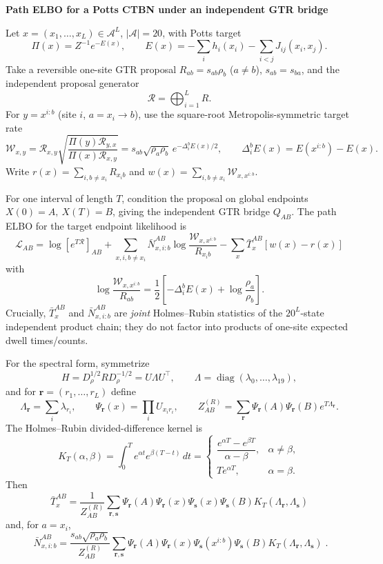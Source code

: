 \documentclass[10pt]{article}
\newcommand{\A}{\mathcal A}
\newcommand{\Rcal}{\mathcal R}
\newcommand{\Wcal}{\mathcal W}
\begin{document}
\small
\begin{center}
{\large\bf Path ELBO for a Potts CTBN under an independent GTR bridge}
\end{center}

Let \(x=(x_1,\ldots,x_L)\in\A^L\), \(|\A|=20\), with Potts target
\[
 \Pi(x)=Z^{-1}e^{-E(x)},\qquad
 E(x)=-\sum_i h_i(x_i)-\sum_{i<j}J_{ij}(x_i,x_j).
\]
Take a reversible one-site GTR proposal
\(R_{ab}=s_{ab}\rho_b\) (\(a\ne b\)), \(s_{ab}=s_{ba}\), and the independent
proposal generator
\[
 \Rcal=\bigoplus_{i=1}^L R .
\]
For \(y=x^{i:b}\) (site \(i\), \(a=x_i\to b\)), use the square-root
Metropolis-symmetric target rate
\[
 \Wcal_{x,y}
 =\Rcal_{x,y}\sqrt{\frac{\Pi(y)\Rcal_{y,x}}{\Pi(x)\Rcal_{x,y}}}
 =s_{ab}\sqrt{\rho_a\rho_b}\,
   e^{-\Delta_i^bE(x)/2},
 \qquad \Delta_i^bE(x)=E(x^{i:b})-E(x).
\]
Write \(r(x)=\sum_{i,b\ne x_i}R_{x_i b}\) and
\(w(x)=\sum_{i,b\ne x_i}\Wcal_{x,x^{i:b}}\).

For one interval of length \(T\), condition the proposal on global endpoints
\(X(0)=A,\ X(T)=B\), giving the independent GTR bridge \(Q_{AB}\).
The path ELBO for the target endpoint likelihood is
\[
\boxed{\;
 \mathcal L_{AB}
 =\log [e^{T\Rcal}]_{AB}
 +\sum_{x,i,b\ne x_i}\bar N^{AB}_{x,i:b}
       \log\frac{\Wcal_{x,x^{i:b}}}{R_{x_i b}}
 -\sum_x\bar T_x^{AB}[w(x)-r(x)] \; }
\]
with
\[
 \log\frac{\Wcal_{x,x^{i:b}}}{R_{ab}}
 =\frac12\left[-\Delta_i^bE(x)+\log\frac{\rho_a}{\rho_b}\right].
\]
Crucially, \(\bar T_x^{AB}\) and \(\bar N^{AB}_{x,i:b}\) are \emph{joint}
Holmes--Rubin statistics of the \(20^L\)-state independent product chain;
they do not factor into products of one-site expected dwell times/counts.

For the spectral form, symmetrize
\[
 H=D_\rho^{1/2}RD_\rho^{-1/2}=U\Lambda U^\top,\qquad
 \Lambda=\operatorname{diag}(\lambda_0,\ldots,\lambda_{19}),
\]
and for \(\boldsymbol r=(r_1,\ldots,r_L)\) define
\[
 \Lambda_{\boldsymbol r}=\sum_i\lambda_{r_i},\qquad
 \Psi_{\boldsymbol r}(x)=\prod_i U_{x_i r_i},\qquad
 Z_{AB}^{(R)}
 =\sum_{\boldsymbol r}\Psi_{\boldsymbol r}(A)\Psi_{\boldsymbol r}(B)
 e^{T\Lambda_{\boldsymbol r}}.
\]
The Holmes--Rubin divided-difference kernel is
\[
 K_T(\alpha,\beta)
 =\int_0^T e^{\alpha t}e^{\beta(T-t)}\,dt
 =
 \begin{cases}
 \dfrac{e^{\alpha T}-e^{\beta T}}{\alpha-\beta},&\alpha\ne\beta,\\[5pt]
 Te^{\alpha T},&\alpha=\beta.
 \end{cases}
\]
Then
\[
 \boxed{\;
 \bar T_x^{AB}
 =\frac{1}{Z_{AB}^{(R)}}
 \sum_{\boldsymbol r,\boldsymbol s}
 \Psi_{\boldsymbol r}(A)\Psi_{\boldsymbol r}(x)
 \Psi_{\boldsymbol s}(x)\Psi_{\boldsymbol s}(B)
 K_T(\Lambda_{\boldsymbol r},\Lambda_{\boldsymbol s}) \;}
\]
and, for \(a=x_i\),
\[
 \boxed{\;
 \bar N_{x,i:b}^{AB}
 =\frac{s_{ab}\sqrt{\rho_a\rho_b}}{Z_{AB}^{(R)}}
 \sum_{\boldsymbol r,\boldsymbol s}
 \Psi_{\boldsymbol r}(A)\Psi_{\boldsymbol r}(x)
 \Psi_{\boldsymbol s}(x^{i:b})\Psi_{\boldsymbol s}(B)
 K_T(\Lambda_{\boldsymbol r},\Lambda_{\boldsymbol s}) \;.}
\]
\end{document}
